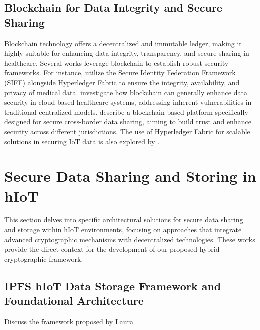 \documentclass[cic,tc,english]{iiufrgs}
\numberwithin{algorithm}{chapter}
\begin{document}
        \subsection{Blockchain for Data Integrity and Secure Sharing}
            Blockchain technology offers a decentralized and immutable ledger, making it highly suitable for enhancing data integrity, transparency, and secure sharing in healthcare. Several works leverage blockchain to establish robust security frameworks. For instance, \citet{Tian2019} utilize the Secure Identity Federation Framework (SIFF) alongside Hyperledger Fabric to ensure the integrity, availability, and privacy of medical data. \citet{Esposito2018} investigate how blockchain can generally enhance data security in cloud-based healthcare systems, addressing inherent vulnerabilities in traditional centralized models. \citet{Rahman2020} describe a blockchain-based platform specifically designed for secure cross-border data sharing, aiming to build trust and enhance security across different jurisdictions. The use of Hyperledger Fabric for scalable solutions in securing IoT data is also explored by \citet{Eghmazi2024}.
    

    \section{Secure Data Sharing and Storing in hIoT}
        \label{sec:securedata}
        This section delves into specific architectural solutions for secure data sharing and storage within hIoT environments, focusing on approaches that integrate advanced cryptographic mechanisms with decentralized technologies. These works provide the direct context for the development of our proposed hybrid cryptographic framework.

        \subsection{IPFS hIoT Data Storage Framework and Foundational Architecture}
            \begin{draft}{Discuss the framework proposed by Laura}
            \end{draft}
\end{document}
